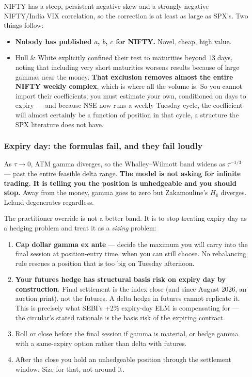 \documentclass[11pt,a4paper]{article}
\begin{document}
NIFTY has a steep, persistent negative skew and a strongly negative NIFTY/India
VIX correlation, so the correction is at least as large as SPX's. Two things
follow:

\begin{itemize}
\item \textbf{Nobody has published $a$, $b$, $c$ for NIFTY.} Novel, cheap, high value.
\item Hull \& White explicitly confined their test to maturities beyond 13 days,
noting that including very short maturities worsens results because of large
gammas near the money. \textbf{That exclusion removes almost the entire NIFTY
weekly complex}, which is where all the volume is. So you cannot import their
coefficients; you must estimate your own, conditioned on days to expiry --- and
because NSE now runs a weekly Tuesday cycle, the coefficient will almost certainly
be a function of position in that cycle, a structure the SPX literature does not have.
\end{itemize}

\subsubsection{Expiry day: the formulas fail, and they fail loudly}

As $\tau \to 0$, ATM gamma diverges, so the Whalley--Wilmott band widens as
$\tau^{-1/3}$ --- past the entire feasible delta range. \textbf{The model is not
asking for infinite trading. It is telling you the position is unhedgeable and
you should stop.} Away from the money, gamma goes to zero but Zakamouline's $H_0$
diverges. Leland degenerates regardless.

The practitioner override is not a better band. It is to stop treating expiry day
as a hedging problem and treat it as a \emph{sizing} problem:

\begin{enumerate}
\item \textbf{Cap dollar gamma ex ante} --- decide the maximum you will carry into
the final session at position-entry time, when you can still choose. No
rebalancing rule rescues a position that is too big on Tuesday afternoon.
\item \textbf{Your futures hedge has structural basis risk on expiry day by
construction.} Final settlement is the index close (and since August 2026, an
auction print), not the futures. A delta hedge in futures cannot replicate it.
This is precisely what SEBI's +2\% expiry-day ELM is compensating for --- the
circular's stated rationale is the basis risk of the expiring contract.
\item Roll or close before the final session if gamma is material, or hedge gamma
with a same-expiry option rather than delta with futures.
\item After the close you hold an unhedgeable position through the settlement
window. Size for that, not around it.
\end{enumerate}
\end{document}
